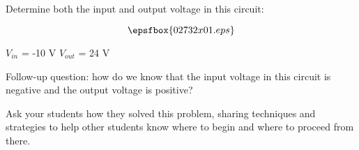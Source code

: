

Determine both the input and output voltage in this circuit:

$$\epsfbox{02732x01.eps}$$







$V_{in}$ = -10 V \hskip 30pt $V_{out}$ = 24 V

\vskip 10pt

Follow-up question: how do we know that the input voltage in this circuit is negative and the output voltage is positive?







Ask your students how they solved this problem, sharing techniques and strategies to help other students know where to begin and where to proceed from there.




